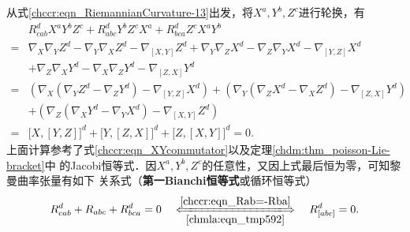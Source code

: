 从式\eqref{chccr:eqn_RiemannianCurvature-13}出发，将$X^a,Y^b,Z^c$进行轮换，有
\begin{align*}
    &R_{cab}^d{X^a}{Y^b}{Z^c} + R_{abc}^d{Y^b}{Z^c}{X^a}+R_{bca}^d{Z^c}{X^a}{Y^b} \\
    =& {\nabla _X}{\nabla _Y}{Z^d} - {\nabla _Y}{\nabla _X}{Z^d} - {\nabla _{[X,Y]}}{Z^d}
      +{\nabla _Y}{\nabla _Z}{X^d} - {\nabla _Z}{\nabla _Y}{X^d} - {\nabla _{[Y,Z]}}{X^d} \\
     &+{\nabla _Z}{\nabla _X}{Y^d} - {\nabla _X}{\nabla _Z}{Y^d} - {\nabla _{[Z,X]}}{Y^d} \\
    =&\left({\nabla _X}({\nabla _Y}{Z^d}-{\nabla _Z}{Y^d}) - {\nabla _{[Y,Z]}}{X^d} \right)
     +\left({\nabla _Y}({\nabla _Z}{X^d}-{\nabla _X}{Z^d}) - {\nabla _{[Z,X]}}{Y^d} \right) \\
    &+\left({\nabla _Z}({\nabla _X}{Y^d}-{\nabla _Y}{X^d}) - {\nabla _{[X,Y]}}{Z^d} \right) \\
    =& \bigl[X, [Y,Z]\bigr]^d+\bigl[Y, [Z,X]\bigr]^d +\bigl[Z, [X,Y]\bigr]^d=0.
\end{align*}
上面计算参考了式\eqref{chccr:eqn_XYcommutator}以及定理\ref{chdm:thm_poisson-Lie-bracket}中
的Jacobi恒等式．因$X^a,Y^b,Z^c$的任意性，又因上式最后恒为零，可知黎曼曲率张量有如下
关系式（{\heiti\bfseries 第一Bianchi恒等式}或{\heiti 循环恒等式}）
\begin{equation}\label{chccr:eqn_Bianchi-I-global}
    R_{cab}^d + R_{abc} + R_{bca}^d = 0 \quad 
    \xLongleftrightarrow[\ref{chmla:eqn_tmp592}]{\ref{chccr:eqn_Rab=-Rba}} \quad
    R_{[abc]}^d = 0.
\end{equation}


